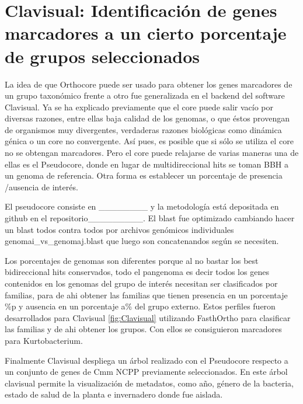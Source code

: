 \documentclass[12pt,twoside]{reedthesis}
\begin{document}
  \section{Clavisual: Identificación de genes marcadores a un cierto
  porcentaje de grupos
  seleccionados}\label{clavisual-identificacion-de-genes-marcadores-a-un-cierto-porcentaje-de-grupos-seleccionados}
  
  La idea de que Orthocore puede ser usado para obtener los genes
  marcadores de un grupo taxonómico frente a otro fue generalizada en el
  backend del software Clavisual. Ya se ha explicado previamente que el
  core puede salir vacío por diversas razones, entre ellas baja calidad de
  los genomas, o que éstos provengan de organismos muy divergentes,
  verdaderas razones biológicas como dinámica génica o un core no
  convergente. Así pues, es posible que si sólo se utiliza el core no se
  obtengan marcadores. Pero el core puede relajarse de varias maneras una
  de ellas es el Pseudocore, donde en lugar de multidireccional hits se
  toman BBH a un genoma de referencia. Otra forma es establecer un
  porcentaje de presencia /ausencia de interés.
  
  El pseudocore consiste en \_\_\_\_\_\_\_\_ y la metodología está
  depositada en github en el repositorio\_\_\_\_\_\_\_\_\_. El blast fue
  optimizado cambiando hacer un blast todos contra todos por archivos
  genómicos individuales genomai\_vs\_genomaj.blast que luego son
  concatenandos según se necesiten.
  
  Los porcentajes de genomas son diferentes porque al no bastar los best
  bidireccional hits conservados, todo el pangenoma es decir todos los
  genes contenidos en los genomas del grupo de interés necesitan ser
  clasificados por familias, para de ahi obtener las familias que tienen
  presencia en un porcentaje \%p y ausencia en un porcentaje a\% del grupo
  externo. Estos perfiles fueron desarrollados para Clavisual
  \autoref{fig:Clavisual} utilizando FasthOrtho para clasificar las
  familias y de ahi obtener los grupos. Con ellos se consiguieron
  marcadores para Kurtobacterium.
  
  Finalmente Clavisual despliega un árbol realizado con el Pseudocore
  respecto a un conjunto de genes de Cmm NCPP previamente seleccionados.
  En este árbol clavisual permite la visualización de metadatos, como año,
  género de la bacteria, estado de salud de la planta e invernadero donde
  fue aislada.
  
\end{document}
